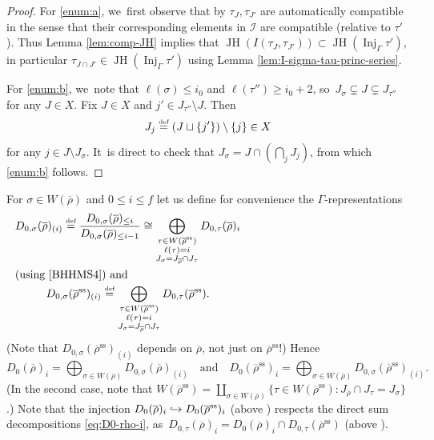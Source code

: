 \documentclass[JEP,XML,SOM,Unicode,NoFloatCountersInSection, NoEqCountersInSection,published]{cedram}
\newcommand\hto{\mathrel{\lhook\joinrel\to}}
\newcommand{\quand}{\quad\text{and}\quad}
\newcommand{\defeq}{\stackrel{\textrm{\tiny{\upshape{def}}}}{=}}
\newcommand{\cI}{\mathcal{I}}
\renewcommand{\ss}{\mathrm{ss}}
\newcommand{\brho}{\overline{\rho}}
\DeclareMathOperator{\Inj}{Inj}
\DeclareMathOperator{\JH}{\mathrm{JH}}
\theoremstyle{plain}
\theoremstyle{definition}
\begin{document}
\begin{proof}
For \eqref{enum:a}, we~first observe that by \cite[Lem.\,12.6]{BP} $\tau_J,\tau_{J'}$ are automatically compatible in the sense that their corresponding elements in $\cI$ are compatible (relative to $\tau'$). Thus Lemma \ref{lem:comp-JH} implies that $\JH(I(\tau_{J},\tau_{J'}))\subset \JH(\Inj_\Gamma\tau')$, in particular $\tau_{J\cap J'}\in \JH(\Inj_\Gamma\tau')$ using Lemma \ref{lem:I-sigma-tau-princ-series}.

For \eqref{enum:b}, we~note that $\ell(\sigma)\leq i_0$ and $\ell(\tau'')\geq i_0+2$, so~$J_\sigma\subsetneq J\subsetneq J_{\tau''}$ for any $J\in X$. Fix $J\in X$ and $j'\in J_{\tau''}\setminus J$. Then
\[
J_j\defeq (J\sqcup \{j'\})\setminus\{j\}\in X
\]
for any $j\in J\setminus J_\sigma$. It~is direct to check that $J_\sigma=J\cap(\bigcap_j J_j)$, from which \eqref{enum:b} follows.
\end{proof}

For $\sigma \in W(\brho)$ and $0 \le i \le f$ let us define for convenience {the $\Gamma$-representations}
\begin{gather*}
D_{0,\sigma}(\brho)_{(i)} \defeq \frac{D_{0,\sigma}(\brho)_{\le i}}{D_{0,\sigma}(\brho)_{\le i-1}} \cong \bigoplus_{\substack{\tau \in W(\brho^\ss)\\\ell(\tau)=i\\J_\sigma = J_{\brho} \cap J_\tau}}D_{0,\tau}(\brho)_i\\
\noalign{\noindent (using \cite[Eq.\,(70)]{BHHMS4}) and}
D_{0,\sigma}(\brho^\ss)_{(i)} \defeq \bigoplus_{\substack{\tau \in W(\brho^\ss)\\\ell(\tau)=i\\ J_\sigma = J_{\brho} \cap J_\tau}}D_{0,\tau}(\brho^\ss).
\end{gather*}
(Note that $D_{0,\sigma}(\brho^\ss)_{(i)}$ depends on $\brho$, not just on $\brho^\ss$!)
Hence
\begin{equation}\label{eq:D0-rho-i}
D_0(\brho)_i = \bigoplus_{\sigma \in W(\brho)} D_{0,\sigma}(\brho)_{(i)} \quand D_0(\brho^\ss)_i = \bigoplus_{\sigma \in W(\brho)} D_{0,\sigma}(\brho^\ss)_{(i)}.
\end{equation}
(In the second case, note that $W(\brho^\ss) = \coprod_{\sigma \in W(\brho)} \{\tau \in W(\brho^\ss): J_{\brho} \cap J_\tau = J_\sigma\}$.)
Note that the injection $D_0(\brho)_i\hto D_0(\brho^\ss)_i$ (\cf above \cite[Eq.\,(66)]{BHHMS4}) respects the direct sum decompositions \eqref{eq:D0-rho-i},
as\ $D_{0,\tau}(\brho)_{i} = D_0(\brho)_i \cap D_{0,\tau}(\brho^\ss)$ (\cf above \cite[Eq.\,(70)]{BHHMS4}).
\end{document}
